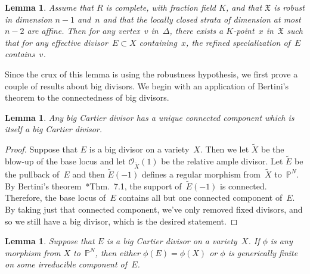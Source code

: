 \documentclass[11pt]{amsart}
\newtheorem{lem}[thm]{Lemma}
\theoremstyle{definition}
\newcommand{\PP}{\mathbb P}
\newcommand{\X}{\mathfrak X}
\begin{document}
\begin{lem}\label{l:lifting-point}
Assume that $R$ is complete, with fraction field $K$, and that $\X$ is robust in
dimension $n-1$ and~$n$ and that the locally closed strata of dimension at most
$n-2$ are affine. Then for any vertex~$v$ in~$\Delta$, there exists a
$K$-point~$x$ in~$\X$ such that for any effective divisor~$E \subset X$
containing~$x$, the refined specialization of~$E$ contains~$v$.
\end{lem}

Since the crux of this lemma is using the robustness hypothesis, we first prove
a couple of results about big divisors. We begin with an application of
Bertini's theorem to the connectedness of big divisors.

\begin{lem}\label{l:big-connected}
Any big Cartier divisor has a unique connected component which is itself a big
Cartier divisor.
\end{lem}

\begin{proof}
Suppose that $E$ is a big divisor on a variety~$X$. Then we let $\widetilde X$
be the blow-up of the base locus and let $\mathcal O_{\widetilde X}(1)$ be the
relative ample divisor. Let $\widetilde E$ be the pullback of~$E$ and then
$\widetilde E(-1)$ defines a regular morphism from~$\widetilde X$ to~$\PP^N$.
By Bertini's theorem~\cite{jouanolou}*{Thm.~7.1}, the support of~$\widetilde E(-1)$ is connected.
Therefore, the base locus of~$E$ contains all but one connected component
of~$E$. By taking just that connected component, we've only removed fixed
divisors, and so we still have a big divisor, which is the desired statement.
\end{proof}

\begin{lem}\label{l:contract-big}
Suppose that $E$ is a big Cartier divisor on a variety~$X$. If $\phi$ is any
morphism from $X$ to~$\PP^N$, then either $\phi(E) = \phi(X)$ or $\phi$ is
generically finite on some irreducible component of~$E$.
\end{lem}
\end{document}
